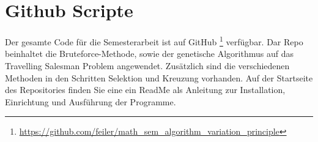 %
%
%
%
\section{Github Scripte
\label{buch:paper:varalg:section:github_scripte}}

Der gesamte Code für die Semesterarbeit ist auf GitHub 
\footnote{\url{https://github.com/feiler/math_sem_algorithm_variation_principle}}
\cite{algorythm:repo} verfügbar. Dar Repo beinhaltet die Bruteforce-Methode, sowie
der genetische Algorithmus auf das Travelling Salesman Problem angewendet. Zusätzlich
sind die verschiedenen Methoden in den Schritten Selektion und Kreuzung vorhanden.
Auf der Startseite des Repositories finden Sie eine ein ReadMe als Anleitung zur 
Installation, Einrichtung und Ausführung der Programme.